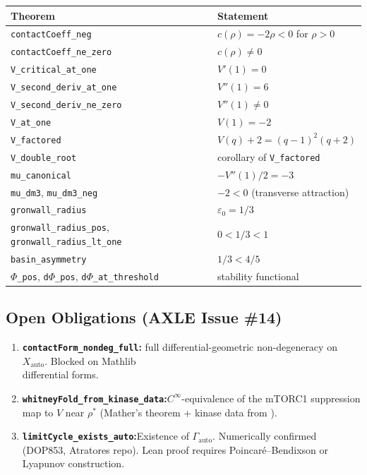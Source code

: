 \documentclass[12pt,a4paper]{article}
\begin{document}
\begin{center}
\small
\begin{tabular}{ll}
\toprule
Theorem & Statement \\
\midrule
\texttt{contactCoeff\_neg}       & $c(\rho) = -2\rho < 0$ for $\rho > 0$ \\
\texttt{contactCoeff\_ne\_zero}  & $c(\rho) \neq 0$ \\
\texttt{V\_critical\_at\_one}    & $V'(1) = 0$ \\
\texttt{V\_second\_deriv\_at\_one} & $V''(1) = 6$ \\
\texttt{V\_second\_deriv\_ne\_zero} & $V''(1) \neq 0$ \\
\texttt{V\_at\_one}              & $V(1) = -2$ \\
\texttt{V\_factored}             & $V(q)+2 = (q-1)^2(q+2)$ \\
\texttt{V\_double\_root}         & corollary of \texttt{V\_factored} \\
\texttt{mu\_canonical}           & $-V''(1)/2 = -3$ \\
\texttt{mu\_dm3}, \texttt{mu\_dm3\_neg} & $-2 < 0$ (transverse attraction) \\
\texttt{gronwall\_radius}        & $\varepsilon_0 = 1/3$ \\
\texttt{gronwall\_radius\_pos}, \texttt{gronwall\_radius\_lt\_one} & $0 < 1/3 < 1$ \\
\texttt{basin\_asymmetry}        & $1/3 < 4/5$ \\
\texttt{$\Phi$\_pos}, \texttt{d$\Phi$\_pos}, \texttt{d$\Phi$\_at\_threshold} & stability functional \\
\bottomrule
\end{tabular}
\end{center}

\subsection*{Open Obligations (AXLE Issue \#14)}

\begin{enumerate}[label=\Alph*.,leftmargin=2em]
  \item \textbf{\texttt{contactForm\_nondeg\_full}:} full differential-geometric
    non-degeneracy on $X_\mathrm{auto}$. Blocked on Mathlib\\ differential forms.
  \item \textbf{\texttt{whitneyFold\_from\_kinase\_data}:}\newline $C^\infty$-equivalence
    of the mTORC1 suppression map to $V$ near $\rho^*$ (Mather's theorem +
    kinase data from \cite{Mizushima2010}).
  \item \textbf{\texttt{limitCycle\_exists\_auto}:}\newline Existence of
    $\Gamma_\mathrm{auto}$. Numerically confirmed (DOP853, Atratores repo).
    Lean proof requires Poincar\'e--Bendixson or Lyapunov construction.
\end{enumerate}
\end{document}
